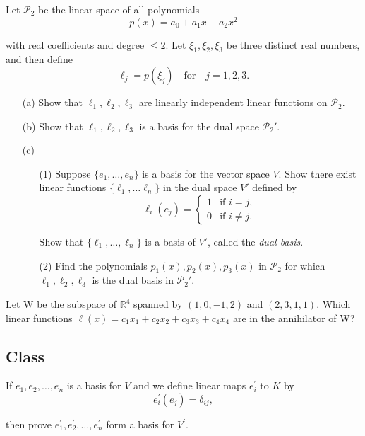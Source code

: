   \begin{exercise}[Lax 2.6] 
    Let $\mathcal{P}_2$ be the linear space of all polynomials
    \[p(x) = a_0 + a_1x + a_2x^2\]
    
    with real coefficients and degree $\leq 2$. Let $\xi_1, \xi_2, \xi_3$ be three distinct real numbers, and then define
    \[\ell_j = p(\xi_j) \quad \text{for} \quad j = 1,2,3.\]
    
    \begin{enumerate}
      \item[(a)] Show that $\ell_1, \ell_2, \ell_3$ are linearly independent linear functions on $\mathcal{P}_2$.
      \item[(b)] Show that $\ell_1, \ell_2, \ell_3$ is a basis for the dual space $\mathcal{P}_2'$.
      \item[(c)] 
        \begin{enumerate}
          \item[(1)] Suppose $\{e_1, \ldots, e_n\}$ is a basis for the vector space $V$. Show there exist linear functions $\{\ell_1, \ldots \ell_n\}$ in the dual space $V'$ defined by
          \[\ell_i(e_j) = \begin{cases} 1 & \text{if } i = j, \\ 0 & \text{if } i \neq j. \end{cases}\]
        
          Show that $\{\ell_1, \ldots, \ell_n\}$ is a basis of $V'$, called the \textit{dual basis}.
          \item[(2)] Find the polynomials $p_1(x), p_2(x), p_3(x)$ in $\mathcal{P}_2$ for which $\ell_1, \ell_2, \ell_3$ is the dual basis in $\mathcal{P}_2'$.
        \end{enumerate}
    \end{enumerate}
  \end{exercise}

  \begin{exercise}[Lax 2.7] 
    Let W be the subspace of $\mathbb{R}^4$ spanned by $(1, 0, -1, 2)$ and $(2, 3, 1, 1)$.
    Which linear functions $\ell(x) = c_1x_1 + c_2x_2 + c_3x_3 + c_4x_4$ are in the annihilator of W?
  \end{exercise}

\subsection{Class}

  \begin{exercise} 
    If $e_1, e_2, \ldots, e_n$ is a basis for $V$ and we define linear maps $e_i^\prime$ to $K$ by
    \[e_i^\prime(e_j) = \delta_{ij},\]
    
    then prove $e_1^\prime, e_2^\prime, \ldots, e_n^\prime$ form a basis for $V^\prime$.
  \end{exercise}

